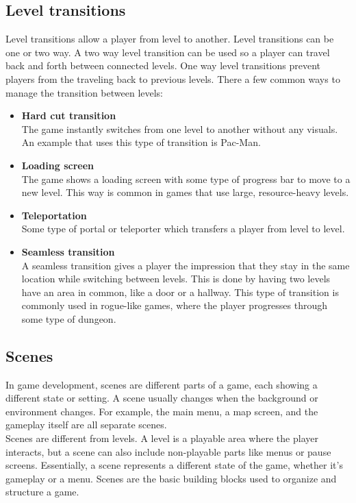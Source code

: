 \documentclass{article} %
\begin{document}
\subsection{Level transitions}
Level transitions allow a player from level to another.
Level transitions can be one or two way.
A two way level transition can be used so a player can travel back and forth between connected levels.
One way level transitions prevent players from the traveling back to previous levels.
There a few common ways to manage the transition between levels:
\begin {itemize}
\item \textbf{Hard cut transition} \\
The game instantly switches from one level to another without any visuals.
An example that uses this type of transition is Pac-Man.
\item \textbf{Loading screen} \\
The game shows a loading screen with some type of progress bar to move to a new level.
This way is common in games that use large, resource-heavy levels.
\item \textbf{Teleportation} \\
Some type of portal or teleporter which transfers a player from level to level.
\item \textbf{Seamless transition} \\
A seamless transition gives a player the impression that they stay in the same location while switching between levels.
This is done by having two levels have an area in common, like a door or a hallway.
This type of transition is commonly used in rogue-like games, where the player progresses through some type of dungeon.
\end{itemize}

\subsection{Scenes}
In game development, scenes are different parts of a game, each showing a different state or setting.
A scene usually changes when the background or environment changes.
For example, the main menu, a map screen, and the gameplay itself are all separate scenes.
\\
Scenes are different from levels.
A level is a playable area where the player interacts, but a scene can also include non-playable parts like menus or pause screens.
Essentially, a scene represents a different state of the game, whether it’s gameplay or a menu.
Scenes are the basic building blocks used to organize and structure a game.
\end{document}
